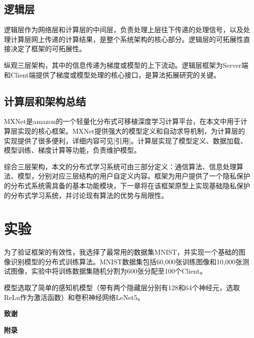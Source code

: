 \documentclass[zihao = -4,cn]{oucart}
\begin{document}
\subsection{逻辑层}
逻辑层作为网络层和计算层的中间层，负责处理上层往下传递的处理信号，以及处理计算层网上传递的计算结果，是整个系统架构的核心部分。逻辑层的可拓展性直接决定了框架的可拓展性。\par
纵观三层架构，其中的信息传递为梯度或模型的上下流动。逻辑层框架为Server端和Client端提供了梯度或模型处理的核心接口，是算法拓展研究的关键。
\subsection{计算层和架构总结}
MXNet是amazon的一个轻量化分布式可移植深度学习计算平台，在本文中用于计算层实现的核心框架。MXNet提供强大的模型定义和自动求导机制，为计算层的实现提供了很多便利，详细内容可见[引用]。计算层实现了模型定义、数据加载、模型训练、梯度计算等功能，负责维护模型。\par
综合三层架构，本文的分布式学习系统可由三部分定义：通信算法、信息处理算法、模型，分别对应三层结构的用户自定义内容。框架为用户提供了一个隐私保护的分布式系统需具备的基本功能模块，下一章将在该框架原型上实现基础隐私保护的分布式学习系统，并讨论现有算法的优势与局限性。
\section{实验}
为了验证框架的有效性，我选择了最常用的数据集MNIST，并实现一个基础的图像识别模型的分布式训练算法。MNIST数据集包括60,000张训练图像和10,000张测试图像，实验中将训练数据集随机分割为600张分配至100个Client。\par
模型选取了简单的感知机模型（带有两个隐藏层分别有128和64个神经元，选取ReLu作为激活函数）和卷积神经网络LeNet5\cite{lecun2015lenet}。


\newpage
%


\newpage
\begin{center}
 \textbf{致谢} \\
\end{center}

\newpage
\begin{center}
 \textbf{附录} \\


\end{center}
\end{document}
